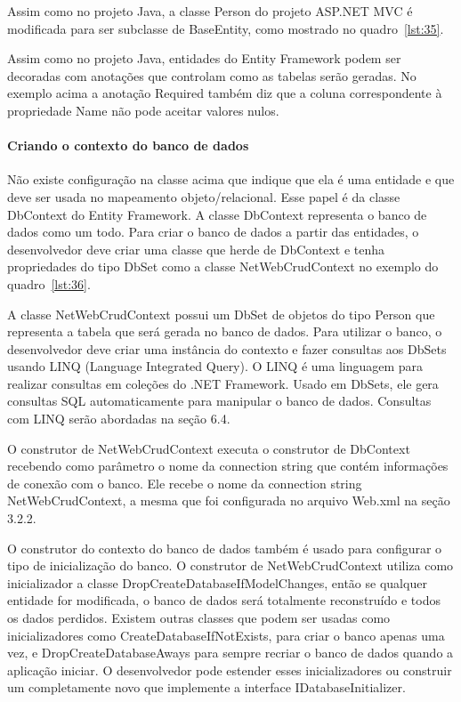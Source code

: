 \documentclass[a4paper,12pt]{article}
\newcommand{\javacode}[3] {
	
}
\newcommand{\sharpcode}[3] {
	
}
\begin{document}
Assim como no projeto Java, a classe Person do projeto ASP.NET MVC é modificada para ser subclasse de BaseEntity, como mostrado no quadro~\ref{lst:35}.

\javacode{code/35.txt}{Classe Person no projeto ASP.NET agora herda de BaseEntity}{lst:35}

Assim como no projeto Java, entidades do Entity Framework podem ser decoradas com anotações que controlam como as tabelas serão geradas. No exemplo acima a anotação Required também diz que a coluna correspondente à propriedade Name não pode aceitar valores nulos.

\paragraph{Criando o contexto do banco de dados}

Não existe configuração na classe acima que indique que ela é uma entidade e que deve ser usada no mapeamento objeto/relacional. Esse papel é da classe DbContext do Entity Framework. A classe DbContext representa o banco de dados como um todo. Para criar o banco de dados a partir das entidades, o desenvolvedor deve criar uma classe que herde de DbContext e tenha propriedades do tipo DbSet como a classe NetWebCrudContext no exemplo do quadro~\ref{lst:36}. 

\sharpcode{code/36.txt}{Classe NetWebCrudContext representa o contexto do banco de dados}{lst:36}

A classe NetWebCrudContext possui um DbSet de objetos do tipo Person que representa a tabela que será gerada no banco de dados. Para utilizar o banco, o desenvolvedor deve criar uma instância do contexto e fazer consultas aos DbSets usando LINQ (Language Integrated Query). O LINQ é uma linguagem para realizar consultas em coleções do .NET Framework. Usado em DbSets, ele gera consultas SQL automaticamente para manipular o banco de dados. Consultas com LINQ serão abordadas na seção 6.4.

O construtor de NetWebCrudContext executa o construtor de DbContext recebendo como parâmetro o nome da connection string que contém informações de conexão com o banco. Ele recebe o nome da connection string NetWebCrudContext, a mesma que foi configurada no arquivo Web.xml na seção 3.2.2.

O construtor do contexto do banco de dados também é usado para configurar o tipo de inicialização do banco. O construtor de NetWebCrudContext utiliza como inicializador a classe DropCreateDatabaseIfModelChanges, então se qualquer entidade for modificada, o banco de dados será totalmente reconstruído e todos os dados perdidos. Existem outras classes que podem ser usadas como inicializadores como CreateDatabaseIfNotExists, para criar o banco apenas uma vez, e DropCreateDatabaseAways para sempre recriar o banco de dados quando a aplicação iniciar. O desenvolvedor pode estender esses inicializadores ou construir um completamente novo que implemente a interface IDatabaseInitializer.
\end{document}
